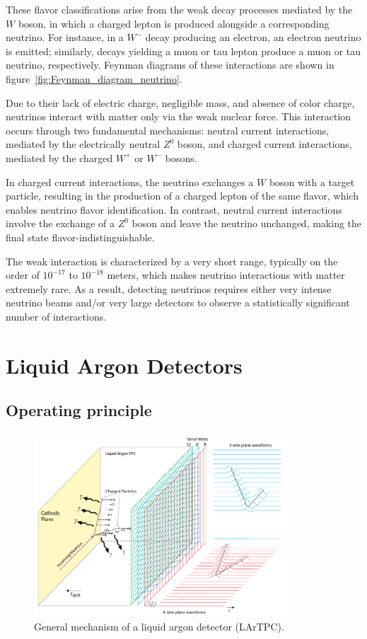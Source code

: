 \documentclass{pracalicmgr}
\begin{document}
These flavor classifications arise from the weak decay processes mediated by the $W$ boson, in which a charged lepton is produced alongside a corresponding neutrino. For instance, in a $W^-$ decay producing an electron, an electron neutrino is emitted; similarly, decays yielding a muon or tau lepton produce a muon or tau neutrino, respectively. Feynman diagrams of these interactions are shown in figure~\ref{fig:Feynman_diagram_neutrino}.

Due to their lack of electric charge, negligible mass, and absence of color charge, neutrinos interact with matter only via the weak nuclear force. This interaction occurs through two fundamental mechanisms: neutral current interactions, mediated by the electrically neutral $Z^0$ boson, and charged current interactions, mediated by the charged $W^+$ or $W^-$ bosons.

In charged current interactions, the neutrino exchanges a $W$ boson with a target particle, resulting in the production of a charged lepton of the same flavor, which enables neutrino flavor identification. In contrast, neutral current interactions involve the exchange of a $Z^0$ boson and leave the neutrino unchanged, making the final state flavor-indistinguishable.

The weak interaction is characterized by a very short range, typically on the order of $10^{-17}$ to $10^{-18}$ meters\cite{WeakInteraction}, which makes neutrino interactions with matter extremely rare. As a result, detecting neutrinos requires either very intense neutrino beams and/or very large detectors to observe a statistically significant number of interactions.

\section{Liquid Argon Detectors}

\subsection{Operating principle}

\begin{figure}[H]
    \centering
    \includegraphics[width=0.85\textwidth]{src/LAr_diagram_DUNE.png}
    \caption{General mechanism of a liquid argon detector (LArTPC).}
    \label{fig:lartcp}
\end{figure}
\end{document}

